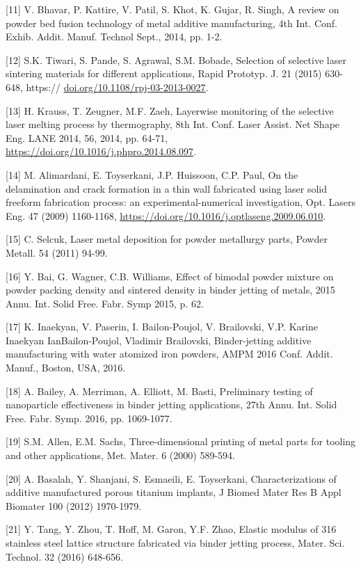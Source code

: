\documentclass[10pt]{article}
\begin{document}
[11] V. Bhavar, P. Kattire, V. Patil, S. Khot, K. Gujar, R. Singh, A review on powder bed fusion technology of metal additive manufacturing, 4th Int. Conf. Exhib. Addit. Manuf. Technol Sept., 2014, pp. 1-2.

[12] S.K. Tiwari, S. Pande, S. Agrawal, S.M. Bobade, Selection of selective laser sintering materials for different applications, Rapid Prototyp. J. 21 (2015) 630-648, https:// \href{http://doi.org/10.1108/rpj-03-2013-0027}{doi.org/10.1108/rpj-03-2013-0027}.

[13] H. Krauss, T. Zeugner, M.F. Zaeh, Layerwise monitoring of the selective laser melting process by thermography, 8th Int. Conf. Laser Assist. Net Shape Eng. LANE 2014, 56, 2014, pp. 64-71, \href{https://doi.org/10.1016/j.phpro.2014.08.097}{https://doi.org/10.1016/j.phpro.2014.08.097}.

[14] M. Alimardani, E. Toyserkani, J.P. Huissoon, C.P. Paul, On the delamination and crack formation in a thin wall fabricated using laser solid freeform fabrication process: an experimental-numerical investigation, Opt. Lasers Eng. 47 (2009) 1160-1168, \href{https://doi.org/10.1016/j.optlaseng.2009.06.010}{https://doi.org/10.1016/j.optlaseng.2009.06.010}.

[15] C. Selcuk, Laser metal deposition for powder metallurgy parts, Powder Metall. 54 (2011) 94-99.

[16] Y. Bai, G. Wagner, C.B. Williams, Effect of bimodal powder mixture on powder packing density and sintered density in binder jetting of metals, 2015 Annu. Int. Solid Free. Fabr. Symp 2015, p. 62.

[17] K. Inaekyan, V. Paserin, I. Bailon-Poujol, V. Brailovski, V.P. Karine Inaekyan IanBailon-Poujol, Vladimir Brailovski, Binder-jetting additive manufacturing with water atomized iron powders, AMPM 2016 Conf. Addit. Manuf., Boston, USA, 2016.

[18] A. Bailey, A. Merriman, A. Elliott, M. Basti, Preliminary testing of nanoparticle effectiveness in binder jetting applications, 27th Annu. Int. Solid Free. Fabr. Symp. 2016, pp. 1069-1077.

[19] S.M. Allen, E.M. Sachs, Three-dimensional printing of metal parts for tooling and other applications, Met. Mater. 6 (2000) 589-594.

[20] A. Basalah, Y. Shanjani, S. Esmaeili, E. Toyserkani, Characterizations of additive manufactured porous titanium implants, J Biomed Mater Res B Appl Biomater 100 (2012) 1970-1979.

[21] Y. Tang, Y. Zhou, T. Hoff, M. Garon, Y.F. Zhao, Elastic modulus of 316 stainless steel lattice structure fabricated via binder jetting process, Mater. Sci. Technol. 32 (2016) 648-656.
\end{document}
